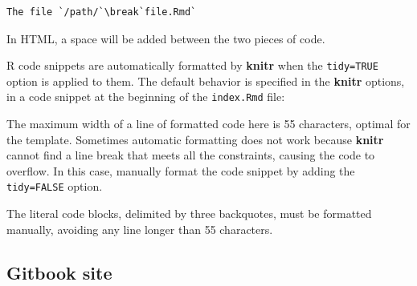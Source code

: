 \documentclass[
  12pt,
  american,
  a4paper,
  extrafontsizes,onecolumn,openright
  ]{memoir}
\newenvironment{Shaded}{\begin{snugshade}}{\end{snugshade}}
\newcommand{\AttributeTok}[1]{\textcolor[rgb]{0.77,0.63,0.00}{#1}}
\newcommand{\CommentTok}[1]{\textcolor[rgb]{0.56,0.35,0.01}{\textit{#1}}}
\newcommand{\ConstantTok}[1]{\textcolor[rgb]{0.00,0.00,0.00}{#1}}
\newcommand{\DecValTok}[1]{\textcolor[rgb]{0.00,0.00,0.81}{#1}}
\newcommand{\FunctionTok}[1]{\textcolor[rgb]{0.00,0.00,0.00}{#1}}
\newcommand{\NormalTok}[1]{#1}
\newcommand{\SpecialCharTok}[1]{\textcolor[rgb]{0.00,0.00,0.00}{#1}}
\newcommand{\StringTok}[1]{\textcolor[rgb]{0.31,0.60,0.02}{#1}}
\newlength{\rf}
\begin{document}
\begin{verbatim}
The file `/path/`\break`file.Rmd`
\end{verbatim}

In HTML, a space will be added between the two pieces of code.

R code snippets are automatically formatted by \textbf{knitr} when the \texttt{tidy=TRUE} option is applied to them.
The default behavior is specified in the \textbf{knitr} options, in a code snippet at the beginning of the \texttt{index.Rmd} file:

\scriptsize

\begin{Shaded}
\end{Shaded}

\normalsize

The maximum width of a line of formatted code here is 55 characters, optimal for the template.
Sometimes automatic formatting does not work because \textbf{knitr} cannot find a line break that meets all the constraints, causing the code to overflow.
In this case, manually format the code snippet by adding the \texttt{tidy=FALSE} option.

The literal code blocks, delimited by three backquotes, must be formatted manually, avoiding any line longer than 55 characters.

\hypertarget{gitbook-site}{%
\subsection{Gitbook site}\label{gitbook-site}}
\end{document}
